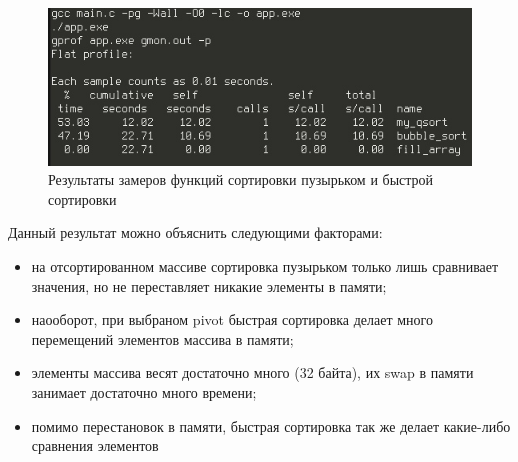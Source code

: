 \documentclass[12pt]{report}
\begin{document}
\begin{figure}[h]
	\centering
	\includegraphics[scale=0.85]{re.jpg}
	\caption{Результаты замеров функций сортировки пузырьком и быстрой сортировки}
	\label{fig:mpr}
\end{figure}

Данный результат можно объяснить следующими факторами:

\begin{itemize} 
	\item на отсортированном массиве сортировка пузырьком только лишь сравнивает значения, но не переставляет никакие элементы в памяти;
	\item наооборот, при выбраном pivot быстрая сортировка делает много перемещений элементов массива в памяти;
	\item элементы массива весят достаточно много (32 байта), их swap в памяти занимает достаточно много времени;
	\item помимо перестановок в памяти, быстрая сортировка так же делает какие-либо сравнения элементов
\end{itemize}


\end{document}
